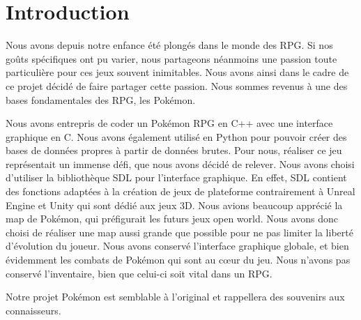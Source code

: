 \documentclass[a4paper,twoside, openany,11pt]{book}
\begin{document}
\pagestyle{PageNormale}

\vspace*{2cm}

\section*{Introduction}
{}

Nous avons depuis notre enfance été plongés dans le monde des RPG. Si nos goûts spécifiques ont pu varier, nous partageons néanmoins une passion toute particulière pour ces jeux souvent inimitables. Nous avons ainsi dans le cadre de ce projet décidé de faire partager cette passion. Nous sommes revenus à une des bases fondamentales des RPG, les Pokémon. 
\vspace*{1cm}

Nous avons entrepris de coder un Pokémon RPG en C++ avec une interface graphique en C. Nous avons également utilisé en Python pour pouvoir créer des bases de données propres à partir de données brutes. Pour nous, réaliser ce jeu représentait un immense défi, que nous avons décidé de relever. Nous avons choisi d’utiliser la bibliothèque SDL pour l'interface graphique. En effet, SDL contient des fonctions adaptées à la création de jeux de plateforme contrairement à Unreal Engine et Unity qui sont dédié aux jeux 3D. Nous avions beaucoup apprécié la map de Pokémon, qui préfigurait les futurs jeux open world. Nous avons donc choisi de réaliser une map aussi grande que possible pour ne pas limiter la liberté d'évolution du joueur. Nous avons conservé l'interface graphique globale, et bien évidemment les combats de Pokémon qui sont au cœur du jeu. Nous n'avons pas conservé l'inventaire, bien que celui-ci soit vital dans un RPG. 
\vspace*{1cm}

Notre projet Pokémon est semblable à l'original et rappellera des souvenirs aux connaisseurs.

\newpage
\end{document}
